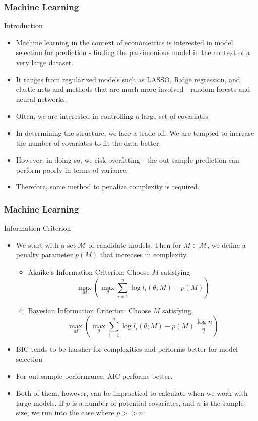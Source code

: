 \documentclass{beamer}
\begin{document}
\begin{frame}
\frametitle{Machine Learning}
Introduction
\begin{itemize}
\item Machine learning in the context of econometrics is interested in model selection for prediction - finding the parsimonious model in the context of a very large dataset. 
\item It ranges from regularized models such as LASSO, Ridge regression, and elastic nets and methods that are much more involved - random forests and neural networks. 
\item Often, we are interested in controlling a large set of covariates 
\item In determining the structure, we face a trade-off: We are tempted to increase the number of covariates to fit the data better. 
\item However, in doing so, we risk overfitting - the out-sample prediction can perform poorly in terms of variance.
\item Therefore, some method to penalize complexity is required. 
\end{itemize}
\end{frame}

\begin{frame}
\frametitle{Machine Learning}
Information Criterion
\begin{itemize}
\item We start with a set $\mathcal{M}$ of candidate models. Then for $M\in\mathcal{M}$, we define a penalty parameter $p(M)$ that increases in complexity. 
\begin{itemize}
\item Akaike's Information Criterion: Choose $M$ satisfying
\[
\max_{M}\left(\max_\theta \sum_{i=1}^n \log{l_i(\theta;M)}-p(M) \right)
\]
\item Bayesian Information Criterion: Choose $M$ satisfying
\[
\max_{M}\left(\max_\theta \sum_{i=1}^n \log{l_i(\theta;M)}-p(M)\frac{\log{n}}{2} \right)
\]
\end{itemize}
\item  BIC tends to be harsher for complexities and performs better for model selection
\item For out-sample performance, AIC performs better. 
\item Both of them, however, can be impractical to calculate when we work with large models. If $p$ is a number of potential covariates, and $n$ is the sample size, we run into the case where $p>>n$. 
\end{itemize}
\end{frame}
\end{document}
